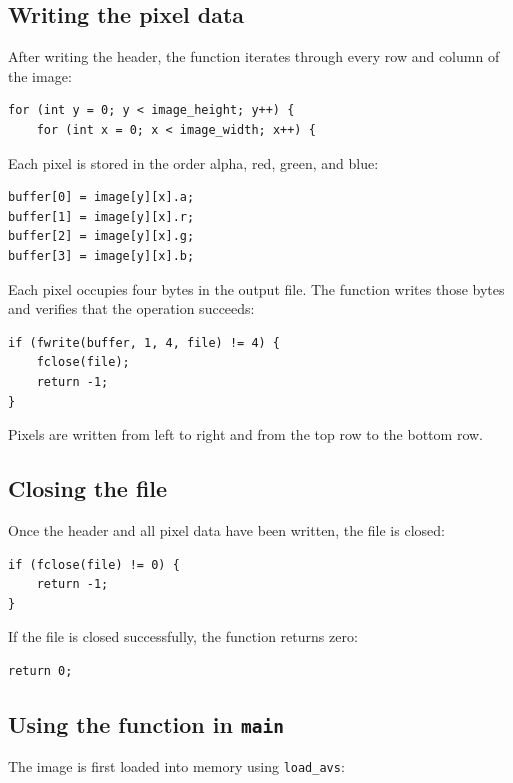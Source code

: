 \documentclass{article}
\begin{document}
\subsection{Writing the pixel data}

After writing the header, the function iterates through every row and column of
the image:

\begin{lstlisting}
for (int y = 0; y < image_height; y++) {
    for (int x = 0; x < image_width; x++) {
\end{lstlisting}

Each pixel is stored in the order alpha, red, green, and blue:

\begin{lstlisting}
buffer[0] = image[y][x].a;
buffer[1] = image[y][x].r;
buffer[2] = image[y][x].g;
buffer[3] = image[y][x].b;
\end{lstlisting}

Each pixel occupies four bytes in the output file. The function writes those
bytes and verifies that the operation succeeds:

\begin{lstlisting}
if (fwrite(buffer, 1, 4, file) != 4) {
    fclose(file);
    return -1;
}
\end{lstlisting}

Pixels are written from left to right and from the top row to the bottom row.

\subsection{Closing the file}

Once the header and all pixel data have been written, the file is closed:

\begin{lstlisting}
if (fclose(file) != 0) {
    return -1;
}
\end{lstlisting}

If the file is closed successfully, the function returns zero:

\begin{lstlisting}
return 0;
\end{lstlisting}

\subsection{Using the function in \texttt{main}}

The image is first loaded into memory using \texttt{load\_avs}:
\end{document}
